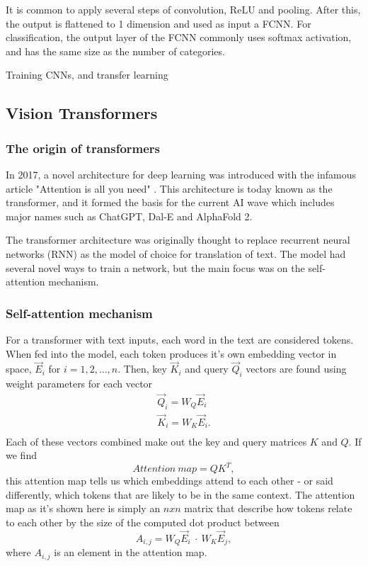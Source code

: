 It is common to apply several steps of convolution, ReLU and pooling. After this, the output is flattened to 1 dimension and used as input a FCNN. For classification, the output layer of the FCNN commonly uses softmax activation, and has the same size as the number of categories.

Training CNNs, and transfer learning


\subsection{Vision Transformers} \label{ssec:vit}
\subsubsection{The origin of transformers}
In 2017, a novel architecture for deep learning was introduced with the infamous article 
"Attention is all you need" \cite{attention}. This architecture is today known as the 
transformer, and it formed the basis for the current AI wave which includes major 
names such as ChatGPT, Dal-E and AlphaFold 2.

The transformer architecture was originally thought to replace recurrent neural networks (RNN)
as the model of choice for translation of text. The model had several novel ways to train a network,
but the main focus was on the self-attention mechanism. 

\subsubsection{Self-attention mechanism}
For a transformer with text inputs, each word in the text are considered tokens. When fed into the model, each token produces it's own embedding vector in space, $\vec{E}_i$ for $i = {1, 2, ..., n}$. Then, key $\vec{K}_i$ and query $\vec{Q}_i$ vectors are found using weight parameters for each vector
\begin{equation}
    \begin{split}
    \vec{Q}_i = W_Q \vec{E}_i  \\
    \vec{K}_i = W_K \vec{E}_i . \\
    \end{split}
\end{equation}
Each of these vectors combined make out the key and query matrices $K$ and $Q$. If we find
\begin{equation}
    Attention\ map = QK^T,
\end{equation}
this attention map tells us which embeddings attend to each other - or said differently, which tokens that are likely to be in the same context. The attention map as it's shown here is simply an $n x n$ matrix that describe how tokens relate to each other by the size of the computed dot product between 
\begin{equation}
   A_{i, j} =  W_Q \vec{E}_i \ \cdot \ W_K \vec{E}_j, 
\end{equation}
where $A_{i, j}$ is an element in the attention map. 

